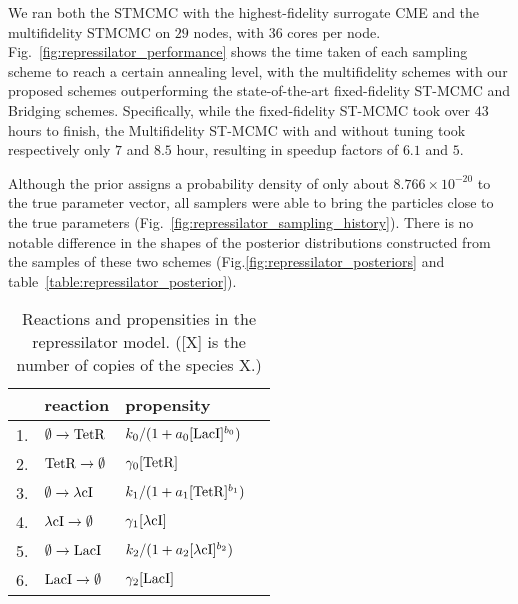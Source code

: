 \documentclass[1p]{article}
\begin{document}
We ran both the STMCMC with the highest-fidelity surrogate CME and the multifidelity STMCMC on $29$ nodes, with $36$ cores per node.
Fig.~\ref{fig:repressilator_performance} shows the time taken of each sampling scheme to reach a certain annealing level, with the multifidelity schemes with our proposed schemes outperforming the state-of-the-art fixed-fidelity ST-MCMC and Bridging schemes.
Specifically, while the fixed-fidelity ST-MCMC took over $43$ hours to finish, the Multifidelity ST-MCMC with and without tuning took respectively only $7$ and $8.5$ hour, resulting in speedup factors of $6.1$ and $5$.

Although the prior assigns a probability density of only about $8.766\times 10^{-20}$ to the true parameter vector, all samplers were able to bring the particles close to the true parameters (Fig.~\ref{fig:repressilator_sampling_history}). There is no notable difference in the shapes of the posterior distributions constructed from the samples of these two schemes (Fig.\ref{fig:repressilator_posteriors} and table~\ref{table:repressilator_posterior}).

\begin{table}[H]
  \centering
  \begin{tabular}{r l l l}
    \toprule
    & reaction & propensity\\
    \midrule
    1. & $\emptyset \rightarrow \mathrm{TetR}$ & $k_0/(1 + a_0[\mathrm{LacI}]^{b_0})$  \\
    2. & $\mathrm{TetR} \rightarrow \emptyset$ & $\gamma_0 [\mathrm{TetR}]$ \\
    3. & $\emptyset \rightarrow \mathrm{\lambda{cI}}$ & $k_1/(1 + a_1[\mathrm{TetR}]^{b_1})$  \\
    4. & $\mathrm{\lambda{cI}} \rightarrow \emptyset$ & $\gamma_1 [\mathrm{\lambda{cI}}]$  \\
    5. & $\emptyset \rightarrow \mathrm{LacI}$ & $k_2/(1 + a_2[\mathrm{\lambda{cI}}]^{b_2})$  \\
    6. & $\mathrm{LacI} \rightarrow \emptyset$ & $\gamma_2 [\mathrm{LacI}]$  \\
    \bottomrule
  \end{tabular}
  \caption{Reactions and propensities in the repressilator model. ([X] is the number of copies of the species X.)}
  \label{table:repressilator_reactions}
\end{table}
\end{document}
